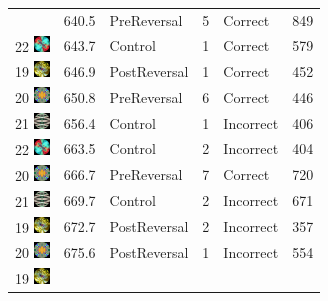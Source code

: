 \documentclass[]{article}
\begin{document}
\begin{longtable}[]{@{}lrlrll@{}}
& 640.5 & PreReversal & 5 & Correct & 849\tabularnewline
22
\includegraphics[width=0.16670in,height=0.16670in]{../ReversalLearning_20130621/images/abs22.jpg}
& 643.7 & Control & 1 & Correct & 579\tabularnewline
19
\includegraphics[width=0.16670in,height=0.16670in]{../ReversalLearning_20130621/images/abs19.jpg}
& 646.9 & PostReversal & 1 & Correct & 452\tabularnewline
20
\includegraphics[width=0.16670in,height=0.16670in]{../ReversalLearning_20130621/images/abs20.jpg}
& 650.8 & PreReversal & 6 & Correct & 446\tabularnewline
21
\includegraphics[width=0.16670in,height=0.16670in]{../ReversalLearning_20130621/images/abs21.jpg}
& 656.4 & Control & 1 & Incorrect & 406\tabularnewline
22
\includegraphics[width=0.16670in,height=0.16670in]{../ReversalLearning_20130621/images/abs22.jpg}
& 663.5 & Control & 2 & Incorrect & 404\tabularnewline
20
\includegraphics[width=0.16670in,height=0.16670in]{../ReversalLearning_20130621/images/abs20.jpg}
& 666.7 & PreReversal & 7 & Correct & 720\tabularnewline
21
\includegraphics[width=0.16670in,height=0.16670in]{../ReversalLearning_20130621/images/abs21.jpg}
& 669.7 & Control & 2 & Incorrect & 671\tabularnewline
19
\includegraphics[width=0.16670in,height=0.16670in]{../ReversalLearning_20130621/images/abs19.jpg}
& 672.7 & PostReversal & 2 & Incorrect & 357\tabularnewline
20
\includegraphics[width=0.16670in,height=0.16670in]{../ReversalLearning_20130621/images/abs20.jpg}
& 675.6 & PostReversal & 1 & Incorrect & 554\tabularnewline
19
\includegraphics[width=0.16670in,height=0.16670in]{../ReversalLearning_20130621/images/abs19.jpg}

\end{longtable}
\end{document}
